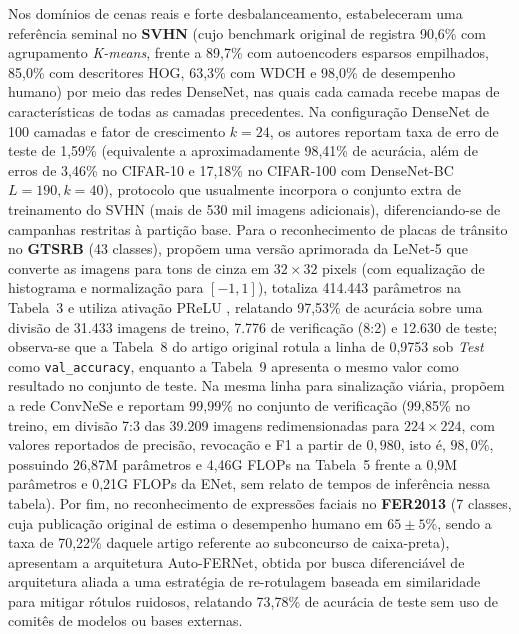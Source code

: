 \documentclass[
    12pt,
    openright,
    oneside,
    a4paper,
    english,
    brazil
]{abntex2}
\begin{document}
Nos domínios de cenas reais e forte desbalanceamento,  estabeleceram uma referência seminal no \textbf{SVHN} (cujo benchmark original de  registra 90,6\% com agrupamento \textit{K-means}, frente a 89,7\% com autoencoders esparsos empilhados, 85,0\% com descritores HOG, 63,3\% com WDCH e 98,0\% de desempenho humano) por meio das redes DenseNet, nas quais cada camada recebe mapas de características de todas as camadas precedentes. Na configuração DenseNet de 100 camadas e fator de crescimento \(k=24\), os autores reportam taxa de erro de teste de 1,59\% (equivalente a aproximadamente 98,41\% de acurácia, além de erros de 3,46\% no CIFAR-10 e 17,18\% no CIFAR-100 com DenseNet-BC \(L=190, k=40\)), protocolo que usualmente incorpora o conjunto extra de treinamento do SVHN (mais de 530 mil imagens adicionais), diferenciando-se de campanhas restritas à partição base. Para o reconhecimento de placas de trânsito no \textbf{GTSRB} (43 classes),  propõem uma versão aprimorada da LeNet-5 que converte as imagens para tons de cinza em \(32 \times 32\) pixels (com equalização de histograma e normalização para \([-1, 1]\)), totaliza 414.443 parâmetros na Tabela~3 e utiliza ativação PReLU \cite{he2015prelu}, relatando 97,53\% de acurácia sobre uma divisão de 31.433 imagens de treino, 7.776 de verificação (8:2) e 12.630 de teste; observa-se que a Tabela~8 do artigo original rotula a linha de 0,9753 sob \textit{Test} como \texttt{val\_accuracy}, enquanto a Tabela~9 apresenta o mesmo valor como resultado no conjunto de teste. Na mesma linha para sinalização viária,  propõem a rede ConvNeSe e reportam 99,99\% no conjunto de verificação (99,85\% no treino, em divisão 7:3 das 39.209 imagens redimensionadas para \(224 \times 224\), com valores reportados de precisão, revocação e F1 a partir de \(0{,}980\), isto é, \(98{,}0\%\), possuindo 26,87M parâmetros e 4,46G FLOPs na Tabela~5 frente a 0,9M parâmetros e 0,21G FLOPs da ENet, sem relato de tempos de inferência nessa tabela). Por fim, no reconhecimento de expressões faciais no \textbf{FER2013} (7 classes, cuja publicação original de  estima o desempenho humano em \(65 \pm 5\%\), sendo a taxa de 70,22\% daquele artigo referente ao subconcurso de caixa-preta),  apresentam a arquitetura Auto-FERNet, obtida por busca diferenciável de arquitetura aliada a uma estratégia de re-rotulagem baseada em similaridade para mitigar rótulos ruidosos, relatando 73,78\% de acurácia de teste sem uso de comitês de modelos ou bases externas.
\end{document}
